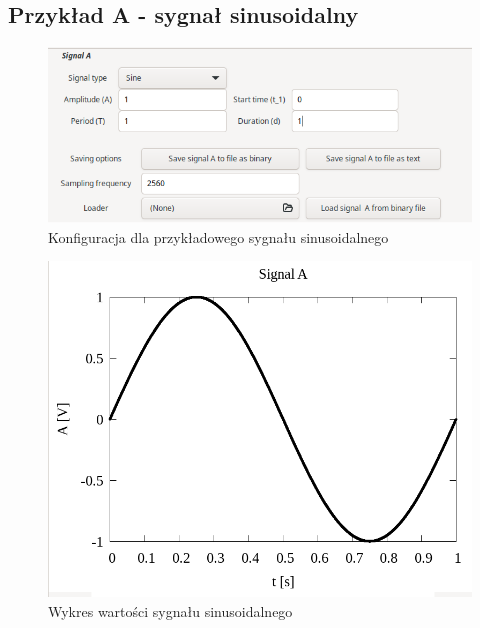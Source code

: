 \documentclass{article}
\begin{document}
\subsection{Przykład A - sygnał sinusoidalny}
\begin{figure}[h!]
 \centering
 \includegraphics[width=14cm]{sine_config.png}
 \vspace{-0.3cm}
 \caption{Konfiguracja dla przykładowego sygnału sinusoidalnego}
 \label{fig:sine_config}
\end{figure}
\newpage
\begin{figure}[h!]
 \centering
 \includegraphics[width=14cm]{sine_plot.png}
 \vspace{-0.3cm}
 \caption{Wykres wartości sygnału sinusoidalnego}
 \label{fig:sine_plot}
\end{figure}
\newpage
\end{document}
